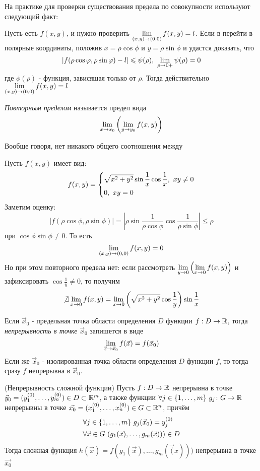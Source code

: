 \begin{addition}
	На практике для проверки существования предела по совокупности используют следующий факт:
	
	Пусть есть $f(x, y)$, и нужно проверить $\lim\limits_{(x, y) \to (0, 0)} f(x, y) = l$. Если в перейти в полярные координаты, положив $x = \rho \cos \phi$ и $y = \rho \sin \phi$ и удастся доказать, что
	\[
		|f(\rho \cos\varphi, \rho \sin\varphi) - l| \leqslant \psi(\rho),\ \lim\limits_{\rho \to 0+} \psi(\rho) = 0
	\]
	где $\phi(\rho)$ - функция, зависящая только от $\rho$. Тогда действительно $\lim\limits_{(x, y) \to (0, 0)} f(x, y) = l$
\end{addition}

\begin{definition}
	\textit{Повторным пределом} называется предел вида
	\[
		\lim\limits_{x \to x_0} \left(\lim\limits_{y \to y_0} f(x, y)\right)
	\]
\end{definition}

\begin{note}
	Вообще говоря, нет никакого общего соотношения между 
\end{note}

\begin{example}
	Пусть $f(x, y)$ имеет вид:
	\[
		f(x, y) = \System{
			&{\sqrt{x^2 + y^2} \sin \frac{1}{x} \cos \frac{1}{x}},\ xy \neq 0
			\\
			&{0,\ xy = 0}
		}
	\]
	Заметим оценку:
	\[
		|f(\rho\cos\phi, \rho\sin\phi)| = |\rho\sin\frac{1}{\rho\cos\phi}\cos\frac{1}{\rho\sin\phi}| \le \rho
	\]
	при $\cos\phi\sin\phi \neq 0$. То есть
	\[
		\lim\limits_{(x, y) \to (0, 0)} f(x, y) = 0
	\]
	Но при этом повторного предела нет: если рассмотреть $\lim\limits_{y \to 0} \left(\lim\limits_{x \to 0} f(x, y)\right)$ и зафиксировать $\cos \frac{1}{y} \neq 0$, то получим
	\[
		\not\exists \lim\limits_{x \to 0} f(x, y) = \lim\limits_{x \to 0} \left(\sqrt{x^2 + y^2} \cos\frac{1}{y}\right)\sin\frac{1}{x}
	\]
\end{example}

\begin{definition}
	Если $\vec{x}_0$ - предельная точка области определения $D$ функции $f: D \to \mathbb{R}$, тогда \textit{непрерывность в точке} $\vec{x}_0$ запишется в виде
	\[
		\lim\limits_{\vec{x} \to \vec{x}_0} f(\vec{x}) = f(\vec{x}_0)
	\]
	Если же $\vec{x}_0$ - изолированная точка области определения $D$ функции $f$, то тогда сразу $f$ непрерывна в $\vec{x}_0$.
\end{definition}

\begin{theorem} (Непрерывность сложной функции)
	Пусть $f: D \to \mathbb{R}$ непрерывна в точке $\vec{y}_0 = (y_1^{(0)}, \ldots, y_m^{(0)}) \in D \subset \mathbb{R}^m$, а также функции $\forall j \in \{1, \ldots, m\}\ g_j \colon G \to \mathbb{R}$ непрерывны в точке $\vec{x_0} = (x_1^{(0)}, \ldots, x_n^{(0)}) \in G \subset \mathbb{R}^n$, причём
	\begin{align*}
		&{\forall j \in \{1, \ldots, m\}\ g_j(\vec{x}_0) = y_j^{(0)}}
		\\
		&{\forall \vec{x} \in G\ (g_1(\vec{x}), \ldots, g_m(\vec{x}))) \in D}
	\end{align*}
	Тогда сложная функция $h(\vec{x}) = f(g_1(\vec{x}), \ldots, g_m(\vec(x)))$ непрерывна в точке $\vec{x_0}$
\end{theorem}


